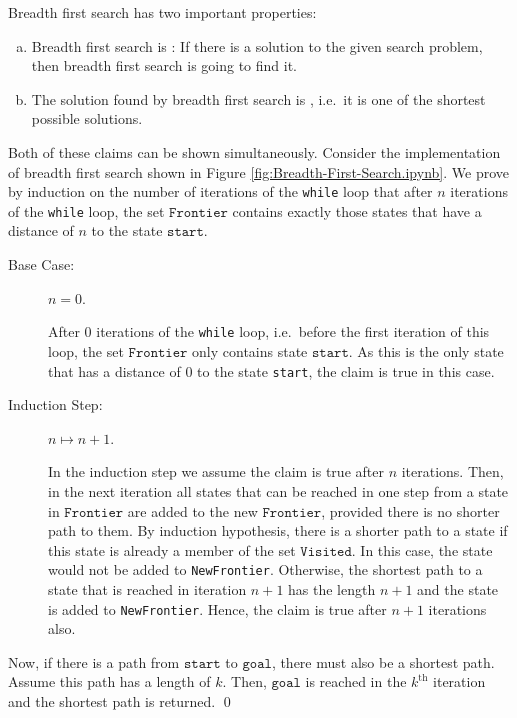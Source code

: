 Breadth first search has two important properties:
\begin{enumerate}[(a)]
\item Breadth first search is :  If there is a solution to the given
      search problem, then breadth first search is going to find it.
\item The solution found by breadth first search is ,  i.e.~it is one of the
      shortest possible solutions.
\end{enumerate}
\proof
Both of these claims can be shown simultaneously.  Consider the implementation of breadth first
search shown in Figure \ref{fig:Breadth-First-Search.ipynb}.  We prove by induction on the number of
iterations of the \texttt{while} loop that after $n$ iterations of the \texttt{while} loop,
the set $\texttt{Frontier}$ contains exactly those states that have a distance of $n$ to the state
$\texttt{start}$.
\pagebreak

\begin{description}
\item[Base Case:] $n = 0$.

      After $0$ iterations of the \texttt{while} loop, i.e.~before the first iteration of this loop,
      the set $\texttt{Frontier}$ only contains state $\texttt{start}$.  As this is the only state that has a
      distance of $0$ to the state \texttt{start}, the claim is true in this case.
\item[Induction Step:] $n \mapsto n+1$.

      In the induction step we assume the claim is true after $n$ iterations.  Then, in the next iteration all
      states that can be reached in one step from a state in $\texttt{Frontier}$ are added to the new $\texttt{Frontier}$,
      provided there is no shorter path to them.  By induction hypothesis, there is a shorter path to a state
      if this state is already a member of the set $\texttt{Visited}$.  In this case, the state would not be
      added to \texttt{NewFrontier}.  Otherwise, the shortest path to a state that is
      reached in iteration $n+1$ has the length $n+1$ and the state is added to \texttt{NewFrontier}.  Hence,
      the claim is true after $n+1$ iterations also.
\end{description}
Now, if there is a path from $\texttt{start}$ to $\texttt{goal}$, there must also be a shortest
path.  Assume this path has a length of $k$.  Then, $\texttt{goal}$ is reached in the $k^{\textrm{th}}$
iteration and the shortest path is returned.
\qed

